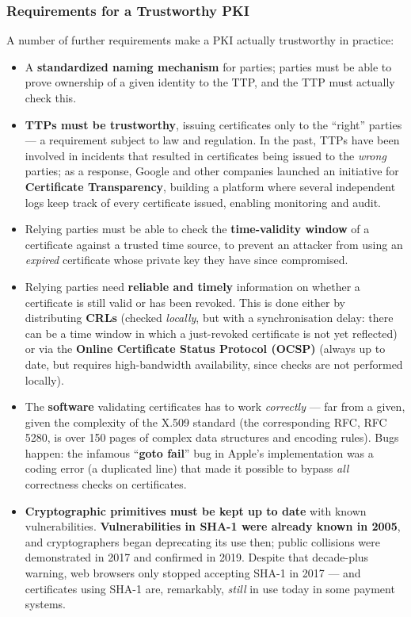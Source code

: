 \documentclass[12pt, a4paper]{article}
\begin{document}
\subsubsection{Requirements for a Trustworthy PKI}
A number of further requirements make a PKI actually trustworthy in practice:
\begin{itemize}
    \item A \textbf{standardized naming mechanism} for parties; parties must be able to prove ownership of a given identity to the TTP, and the TTP must actually check this.
    \item \textbf{TTPs must be trustworthy}, issuing certificates only to the ``right'' parties --- a requirement subject to law and regulation. In the past, TTPs have been involved in incidents that resulted in certificates being issued to the \emph{wrong} parties; as a response, Google and other companies launched an initiative for \textbf{Certificate Transparency}, building a platform where several independent logs keep track of every certificate issued, enabling monitoring and audit.
    \item Relying parties must be able to check the \textbf{time-validity window} of a certificate against a trusted time source, to prevent an attacker from using an \emph{expired} certificate whose private key they have since compromised.
    \item Relying parties need \textbf{reliable and timely} information on whether a certificate is still valid or has been revoked. This is done either by distributing \textbf{CRLs} (checked \emph{locally}, but with a synchronisation delay: there can be a time window in which a just-revoked certificate is not yet reflected) or via the \textbf{Online Certificate Status Protocol (OCSP)} (always up to date, but requires high-bandwidth availability, since checks are not performed locally).
    \item The \textbf{software} validating certificates has to work \emph{correctly} --- far from a given, given the complexity of the X.509 standard (the corresponding RFC, RFC 5280, is over 150 pages of complex data structures and encoding rules). Bugs happen: the infamous ``\textbf{goto fail}'' bug in Apple's implementation was a coding error (a duplicated line) that made it possible to bypass \emph{all} correctness checks on certificates.
    \item \textbf{Cryptographic primitives must be kept up to date} with known vulnerabilities. \textcolor{red!70!black}{\textbf{Vulnerabilities in SHA-1 were already known in 2005}, and cryptographers began deprecating its use then; public collisions were demonstrated in 2017 and confirmed in 2019. Despite that decade-plus warning, web browsers only stopped accepting SHA-1 in 2017 --- and certificates using SHA-1 are, remarkably, \emph{still} in use today in some payment systems.}
\end{itemize}
\end{document}
